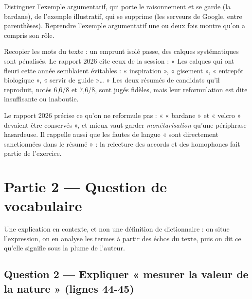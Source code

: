 \documentclass[11pt,a4paper]{article}
\begin{document}
\begin{methode}

Distinguer l'exemple argumentatif, qui porte le raisonnement et se garde (la bardane), de l'exemple illustratif, qui se supprime (les serveurs de Google, entre parenthèses). Reprendre l'exemple argumentatif une ou deux fois montre qu'on a compris son rôle.

\end{methode}

\begin{piege}

Recopier les mots du texte : un emprunt isolé passe, des calques systématiques sont pénalisés. Le rapport 2026 cite ceux de la session : « Les calques qui ont fleuri cette année semblaient évitables : « inspiration », « gisement », « entrepôt biologique », « servir de guide »\ldots{} » Les deux résumés de candidats qu'il reproduit, notés 6,6/8 et 7,6/8, sont jugés fidèles, mais leur reformulation est dite insuffisante ou inaboutie.

\end{piege}

\begin{jury}

Le rapport 2026 précise ce qu'on ne reformule pas : « « bardane » et « velcro » devaient être conservés », et mieux vaut garder \emph{monétarisation} qu'une périphrase hasardeuse. Il rappelle aussi que les fautes de langue « sont directement sanctionnées dans le résumé » : la relecture des accords et des homophones fait partie de l'exercice.

\end{jury}

\hypertarget{partie-2-question-de-vocabulaire}{%
\section{Partie 2 --- Question de vocabulaire}\label{partie-2-question-de-vocabulaire}}

Une explication en contexte, et non une définition de dictionnaire : on situe l'expression, on en analyse les termes à partir des échos du texte, puis on dit ce qu'elle signifie sous la plume de l'auteur.

\hypertarget{question-2-expliquer-mesurer-la-valeur-de-la-nature-lignes-44-45}{%
\subsection{Question 2 --- Expliquer « mesurer la valeur de la nature » (lignes 44-45)}\label{question-2-expliquer-mesurer-la-valeur-de-la-nature-lignes-44-45}}
\end{document}

